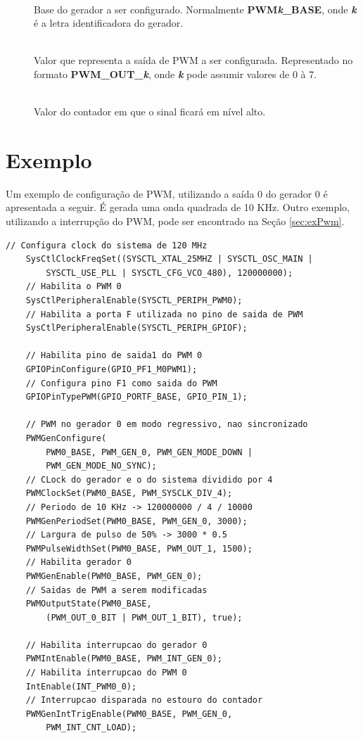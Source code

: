 \begin{description}
	\item []\hfill \\
	Base do gerador a ser configurado. Normalmente \textbf{PWM\emph{k}\_BASE}, onde \textbf{\emph{k}} é a letra identificadora do gerador.
	
	\item []\hfill \\
	Valor que representa a saída de PWM a ser configurada. Representado no formato \textbf{PWM\_OUT\_\emph{k}}, onde \textbf{\emph{k}} pode assumir valores de 0 à 7.
	
	\item []\hfill \\
	Valor do contador em que o sinal ficará em nível alto.
\end{description}

\section{Exemplo}

Um exemplo de configuração de PWM, utilizando a saída 0 do gerador 0 é apresentada a seguir. É gerada uma onda quadrada de 10 KHz. Outro exemplo, utilizando a interrupção do PWM, pode ser
 encontrado na Seção \ref{sec:exPwm}.
 
\begin{lstlisting}[style=citacao]
	// Configura clock do sistema de 120 MHz
	SysCtlClockFreqSet((SYSCTL_XTAL_25MHZ | SYSCTL_OSC_MAIN | 
		SYSCTL_USE_PLL | SYSCTL_CFG_VCO_480), 120000000);
	// Habilita o PWM 0
	SysCtlPeripheralEnable(SYSCTL_PERIPH_PWM0);
	// Habilita a porta F utilizada no pino de saida de PWM
	SysCtlPeripheralEnable(SYSCTL_PERIPH_GPIOF);

	// Habilita pino de saida1 do PWM 0
	GPIOPinConfigure(GPIO_PF1_M0PWM1);
	// Configura pino F1 como saida do PWM
	GPIOPinTypePWM(GPIO_PORTF_BASE, GPIO_PIN_1);

	// PWM no gerador 0 em modo regressivo, nao sincronizado
	PWMGenConfigure(
		PWM0_BASE, PWM_GEN_0, PWM_GEN_MODE_DOWN |
		PWM_GEN_MODE_NO_SYNC);
	// CLock do gerador e o do sistema dividido por 4
	PWMClockSet(PWM0_BASE, PWM_SYSCLK_DIV_4);
	// Periodo de 10 KHz -> 120000000 / 4 / 10000
	PWMGenPeriodSet(PWM0_BASE, PWM_GEN_0, 3000);
	// Largura de pulso de 50% -> 3000 * 0.5
	PWMPulseWidthSet(PWM0_BASE, PWM_OUT_1, 1500);
	// Habilita gerador 0
	PWMGenEnable(PWM0_BASE, PWM_GEN_0);
	// Saidas de PWM a serem modificadas
	PWMOutputState(PWM0_BASE,
		(PWM_OUT_0_BIT | PWM_OUT_1_BIT), true);
	
	// Habilita interrupcao do gerador 0
	PWMIntEnable(PWM0_BASE, PWM_INT_GEN_0);
	// Habilita interrupcao do PWM 0
	IntEnable(INT_PWM0_0);
	// Interrupcao disparada no estouro do contador
	PWMGenIntTrigEnable(PWM0_BASE, PWM_GEN_0, 
		PWM_INT_CNT_LOAD);
\end{lstlisting}